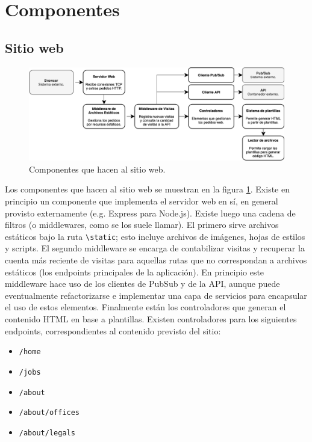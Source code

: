 \documentclass[11pt]{scrartcl}
\begin{document}
\section{Componentes}\label{sec:components}

\subsection{Sitio web}

\begin{figure}
\begin{center}
\includegraphics[width=\linewidth]{img/website-component}
\end{center}
\caption{Componentes que hacen al sitio web.}
\label{fig:website}
\end{figure}

Los componentes que hacen al sitio web se muestran en la figura \ref{fig:website}. Existe en principio un componente que implementa el servidor web en sí, en general provisto externamente (e.g. Express para Node.js). Existe luego una cadena de filtros (o middlewares, como se los suele llamar). El primero sirve archivos estáticos bajo la ruta \texttt{\textbackslash{}static}; esto incluye archivos de imágenes, hojas de estilos y scripts. El segundo middleware se encarga de contabilizar visitas y recuperar la cuenta más reciente de visitas para aquellas rutas que no correspondan a archivos estáticos (los endpoints principales de la aplicación). En principio este middleware hace uso de los clientes de PubSub y de la API, aunque puede eventualmente refactorizarse e implementar una capa de servicios para encapsular el uso de estos elementos. Finalmente están los controladores que generan el contenido HTML en base a plantillas. Existen controladores para los siguientes endpoints, correspondientes al contenido previsto del sitio:

\begin{itemize}
\item \texttt{/home}
\item \texttt{/jobs}
\item \texttt{/about}
\item \texttt{/about/offices}
\item \texttt{/about/legals}
\end{itemize}
\end{document}
